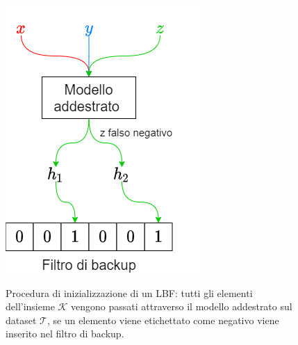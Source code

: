 \documentclass[../../main.tex]{subfiles}
\begin{document}
    \begin{figure}[H]
        \centering
        \includegraphics[width=\textwidth/2]{immagini/5_1/LBFInizializzazione.png}
        \caption{Procedura di inizializzazione di un LBF: tutti gli elementi dell'insieme $\mathcal{K}$ vengono passati attraverso il modello addestrato sul dataset $\mathcal{T}$, se un elemento viene etichettato come negativo viene inserito nel filtro di backup.}
        \label{fig:LBFInizializzazione}
        \caption{}
        \label{fig:confrontoInserimento}
    \end{figure}
\end{document}

